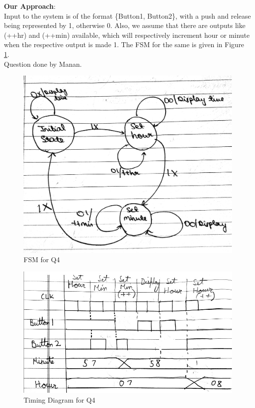 \documentclass[11pt,a4paper]{article}
\begin{document}
 	\textbf{Our Approach}:\\
 	Input to the system is of the format \{Button1, Button2\}, with a push and release being represented by 1, otherwise 0. Also, we assume that there are outputs like (++hr) and (++min) available, which will respectively increment hour or minute when the respective output is made 1. The FSM for the same is given in Figure \ref{fig:q4fsm}.\\
 	Question done by Manan.
	\begin{figure}[H]
		\centering
		\includegraphics[scale=0.12]{images/q4fsm}
		\caption[]{FSM for Q4}
		\label{fig:q4fsm}
	\end{figure}
	
	\begin{figure}[H]
		\centering
		\includegraphics[width=1\linewidth]{images/q4timing}
		\caption[]{Timing Diagram for Q4}
		\label{fig:q4timing}
	\end{figure}
\end{document}
